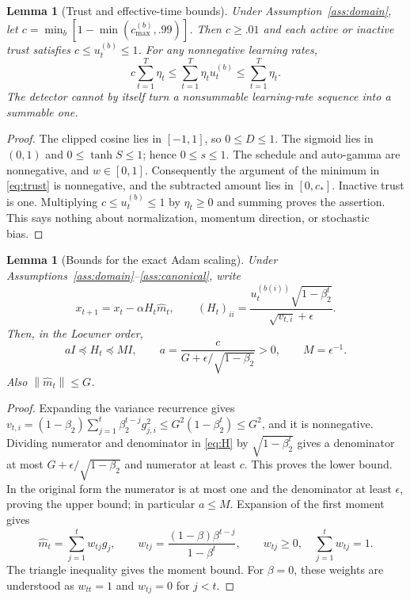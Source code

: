 \documentclass[11pt]{article}
\newtheorem{lemma}[theorem]{Lemma}
\theoremstyle{definition}
\theoremstyle{remark}
\newcommand{\norm}[1]{\left\lVert#1\right\rVert}
\begin{document}
\begin{lemma}[Trust and effective-time bounds]\label{lem:trust}
Under Assumption~\ref{ass:domain}, let
$c=\min_b[1-\min(c_{\max}^{(b)},.99)]$. Then $c\ge.01$ and each active
or inactive trust satisfies $c\le u_t^{(b)}\le1$. For any nonnegative
learning rates,
\[
 c\sum_{t=1}^T\eta_t\le\sum_{t=1}^T\eta_t u_t^{(b)}\le\sum_{t=1}^T\eta_t.
\]
The detector cannot by itself turn a nonsummable learning-rate sequence into
a summable one.
\end{lemma}
\begin{proof}
The clipped cosine lies in $[-1,1]$, so $0\le D\le1$.
The sigmoid lies in $(0,1)$ and $0\le\tanh S\le1$; hence $0\le s\le1$.
The schedule and auto-gamma are nonnegative, and $w\in[0,1]$.
Consequently the argument of the minimum in \eqref{eq:trust} is nonnegative,
and the subtracted amount lies in $[0,c_*]$. Inactive trust is one. Multiplying
$c\le u_t^{(b)}\le1$ by $\eta_t\ge0$ and summing proves the assertion.
This says nothing about normalization, momentum direction, or stochastic bias.
\end{proof}

\begin{lemma}[Bounds for the exact Adam scaling]\label{lem:scaling}
Under Assumptions~\ref{ass:domain}--\ref{ass:canonical}, write
\begin{equation}\label{eq:H}
 x_{t+1}=x_t-\alpha H_t\widehat m_t,\qquad
 (H_t)_{ii}=\frac{u_t^{(b(i))}\sqrt{1-\beta_2^t}}{\sqrt{v_{t,i}}+\epsilon}.
\end{equation}
Then, in the Loewner order,
\begin{equation}\label{eq:ab}
 aI\preceq H_t\preceq MI,\qquad
 a=\frac{c}{G+\epsilon/\sqrt{1-\beta_2}}>0,\qquad M=\epsilon^{-1}.
\end{equation}
Also $\norm{\widehat m_t}\le G$.
\end{lemma}
\begin{proof}
Expanding the variance recurrence gives
$v_{t,i}=(1-\beta_2)\sum_{j=1}^t\beta_2^{t-j}g_{j,i}^2\le
G^2(1-\beta_2^t)\le G^2$, and it is nonnegative.
Dividing numerator and denominator in \eqref{eq:H} by
$\sqrt{1-\beta_2^t}$ gives a denominator at most
$G+\epsilon/\sqrt{1-\beta_2}$ and numerator at least $c$. This proves the
lower bound. In the original form the numerator is at most one and the
denominator at least $\epsilon$, proving the upper bound; in particular
$a\le M$.
Expansion of the first moment gives
\begin{equation}\label{eq:weights}
 \widehat m_t=\sum_{j=1}^t w_{tj}g_j,\qquad
 w_{tj}=\frac{(1-\beta)\beta^{t-j}}{1-\beta^t},\qquad
 w_{tj}\ge0,\quad\sum_{j=1}^t w_{tj}=1.
\end{equation}
The triangle inequality gives the moment bound. For $\beta=0$, these weights
are understood as $w_{tt}=1$ and $w_{tj}=0$ for $j<t$.
\end{proof}
\end{document}
